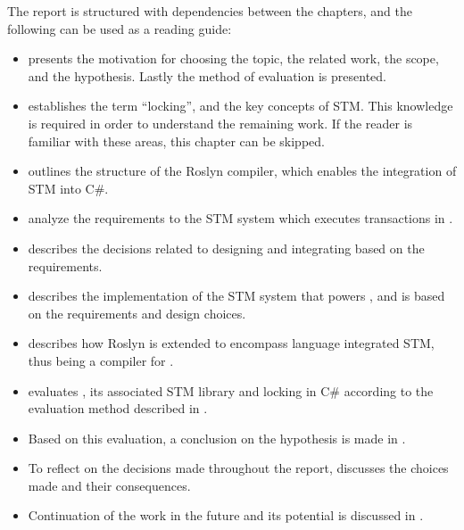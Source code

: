 The report is structured with dependencies between the chapters, and the following can be used as a reading guide:
\begin{itemize}
	\item {} presents the motivation for choosing the topic, the related work, the scope, and the hypothesis. Lastly the method of evaluation is presented.
	\item {} establishes the term ``locking'', and the key concepts of \ac{STM}. This knowledge is required in order to understand the remaining work. If the reader is familiar with these areas, this chapter can be skipped.
	\item {} outlines the structure of the Roslyn compiler, which enables the integration of \ac{STM} into C\#.
	\item {} analyze the requirements to the \ac{STM} system which executes transactions in \stmname.
	\item {} describes the decisions related to designing and integrating \stmname based on the requirements.
	\item {} describes the implementation of the \ac{STM} system that powers \stmname, and is based on the requirements and design choices.
	\item {} describes how Roslyn is extended to encompass language integrated \ac{STM}, thus being a compiler for \stmname.
	\item {} evaluates \stmname, its associated \ac{STM} library and locking in C\# according to the evaluation method described in .
	\item Based on this evaluation, a conclusion on the hypothesis is made in .
	 \item To reflect on the decisions made throughout the report,  discusses the choices made and their consequences.
	 \item Continuation of the work in the future and its potential is discussed in .
\end{itemize}

